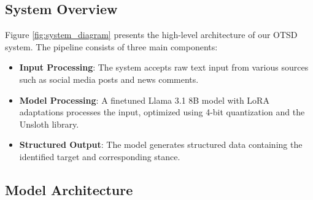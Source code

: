 \documentclass[twocolumn,11pt,letterpaper]{article}
\begin{document}
\subsection{System Overview}
\label{sec:system_overview}

Figure \ref{fig:system_diagram} presents the high-level architecture of our OTSD system. The pipeline consists of three main components:

\begin{itemize}
    \item \textbf{Input Processing}: The system accepts raw text input from various sources such as social media posts and news comments.
    \item \textbf{Model Processing}: A finetuned Llama 3.1 8B model with LoRA adaptations processes the input, optimized using 4-bit quantization and the Unsloth library.
    \item \textbf{Structured Output}: The model generates structured data containing the identified target and corresponding stance.
\end{itemize}

\begin{figure*}[t]
\centering

\caption{High-Level OTSD System Diagram showing the complete pipeline from raw text input to structured stance and target output. The system utilizes a finetuned Llama 3.1 8B model with LoRA adaptations, optimized using 4-bit quantization and the Unsloth library.}
\label{fig:system_diagram}
\end{figure*}

\begin{figure*}[t]
\centering

\caption{Detailed Research Architecture showing the complete pipeline from training data through model finetuning to evaluation. The system combines VAST and TSE datasets for training, processes through a finetuned Llama 3.1 8B model, and evaluates outputs using multiple methods including Gemini, DeepSeek, and BERTweet for semantic similarity assessment.}
\label{fig:research_arch}
\end{figure*}

\subsection{Model Architecture}
\label{sec:model_arch}
\end{document}
